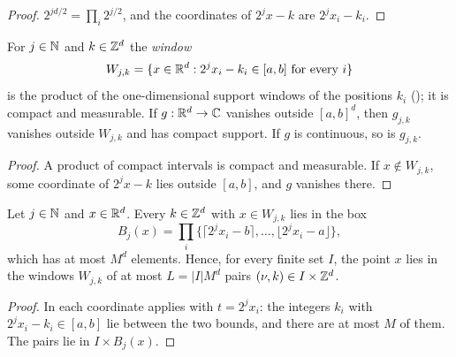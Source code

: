 \begin{proof}
\leanok
{}
$2^{jd/2} = \prod_i 2^{j/2}$, and the coordinates of $2^j x - k$ are $2^j x_i - k_i$.
\end{proof}

\begin{lemma}
\label{lem:daub-rd-windows}
\leanok
{}
For $j \in \mathbb{N}$ and $k \in \mathbb{Z}^d$ the \emph{window}
\[
  W_{j,k} = \{x \in \mathbb{R}^d : 2^j x_i - k_i \in [a, b] \text{ for every } i\}
\]
is the product of the one-dimensional support windows of the positions $k_i$
(); it is compact and measurable. If $g : \mathbb{R}^d \to \mathbb{C}$ vanishes
outside $[a, b]^d$, then $g_{j,k}$ vanishes outside $W_{j,k}$ and has compact support. If $g$ is
continuous, so is $g_{j,k}$.
\end{lemma}

\begin{proof}
\leanok
A product of compact intervals is compact and measurable. If $x \notin W_{j,k}$, some coordinate
of $2^j x - k$ lies outside $[a, b]$, and $g$ vanishes there.
\end{proof}

\begin{lemma}
\label{lem:daub-rd-overlap}
\leanok
{}
Let $j \in \mathbb{N}$ and $x \in \mathbb{R}^d$. Every $k \in \mathbb{Z}^d$ with $x \in W_{j,k}$ lies in the box
\[
  B_j(x) = \prod_{i} \bigl\{\lceil 2^j x_i - b \rceil, \dots, \lfloor 2^j x_i - a \rfloor\bigr\} ,
\]
which has at most $M^d$ elements. Hence, for every finite set $I$, the point $x$ lies in the
windows $W_{j,k}$ of at most $L = |I| M^d$ pairs $(\nu, k) \in I \times \mathbb{Z}^d$.
\end{lemma}

\begin{proof}
\leanok
{}
In each coordinate  applies with $t = 2^j x_i$: the integers
$k_i$ with $2^j x_i - k_i \in [a, b]$ lie between the two bounds, and there are at most $M$ of
them. The pairs lie in $I \times B_j(x)$.
\end{proof}

